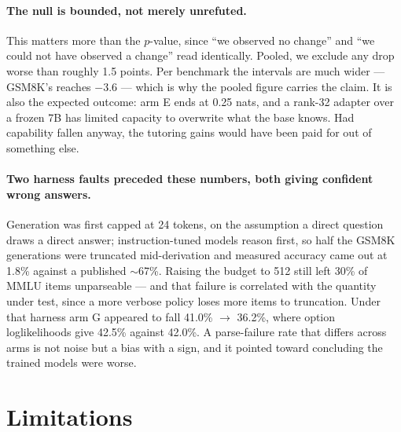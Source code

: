 \documentclass[11pt]{article}
\begin{document}
\paragraph{The null is bounded, not merely unrefuted.} This matters more than the $p$-value, since ``we
observed no change'' and ``we could not have observed a change'' read identically. Pooled, we exclude any
drop worse than roughly 1.5 points. Per benchmark the intervals are much wider --- GSM8K's reaches $-3.6$
--- which is why the pooled figure carries the claim. It is also the expected outcome: arm E ends at 0.25
nats, and a rank-32 adapter over a frozen 7B has limited capacity to overwrite what the base knows. Had
capability fallen anyway, the tutoring gains would have been paid for out of something else.

\paragraph{Two harness faults preceded these numbers, both giving confident wrong answers.} Generation was
first capped at 24 tokens, on the assumption a direct question draws a direct answer; instruction-tuned
models reason first, so half the GSM8K generations were truncated mid-derivation and measured accuracy came
out at 1.8\% against a published $\sim$67\%. Raising the budget to 512 still left 30\% of MMLU items
unparseable --- and that failure is correlated with the quantity under test, since a more verbose policy
loses more items to truncation. Under that harness arm G appeared to fall 41.0\% $\rightarrow$ 36.2\%,
where option loglikelihoods give 42.5\% against 42.0\%. A parse-failure rate that differs across arms is
not noise but a bias with a sign, and it pointed toward concluding the trained models were worse.

\section{Limitations}
\label{sec:limits}
\end{document}
